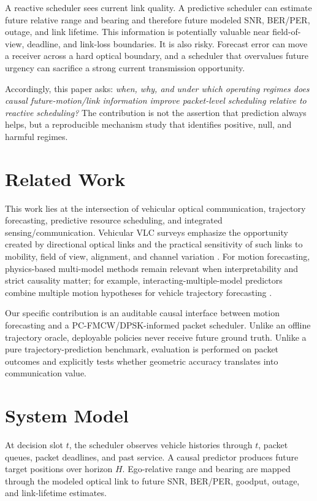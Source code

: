 \documentclass[conference]{IEEEtran}
\begin{document}
A reactive scheduler sees current link quality. A predictive scheduler can estimate future relative range and bearing and therefore future modeled SNR, BER/PER, outage, and link lifetime. This information is potentially valuable near field-of-view, deadline, and link-loss boundaries. It is also risky. Forecast error can move a receiver across a hard optical boundary, and a scheduler that overvalues future urgency can sacrifice a strong current transmission opportunity.

Accordingly, this paper asks: \emph{when, why, and under which operating regimes does causal future-motion/link information improve packet-level scheduling relative to reactive scheduling?} The contribution is not the assertion that prediction always helps, but a reproducible mechanism study that identifies positive, null, and harmful regimes.

\section{Related Work}
This work lies at the intersection of vehicular optical communication, trajectory forecasting, predictive resource scheduling, and integrated sensing/communication. Vehicular VLC surveys emphasize the opportunity created by directional optical links and the practical sensitivity of such links to mobility, field of view, alignment, and channel variation \cite{memedi2021vehicular}. For motion forecasting, physics-based multi-model methods remain relevant when interpretability and strict causality matter; for example, interacting-multiple-model predictors combine multiple motion hypotheses for vehicle trajectory forecasting \cite{gao2023imm}.

Our specific contribution is an auditable causal interface between motion forecasting and a PC-FMCW/DPSK-informed packet scheduler. Unlike an offline trajectory oracle, deployable policies never receive future ground truth. Unlike a pure trajectory-prediction benchmark, evaluation is performed on packet outcomes and explicitly tests whether geometric accuracy translates into communication value.

\section{System Model}
At decision slot $t$, the scheduler observes vehicle histories through $t$, packet queues, packet deadlines, and past service. A causal predictor produces future target positions over horizon $H$. Ego-relative range and bearing are mapped through the modeled optical link to future SNR, BER/PER, goodput, outage, and link-lifetime estimates.
\end{document}
